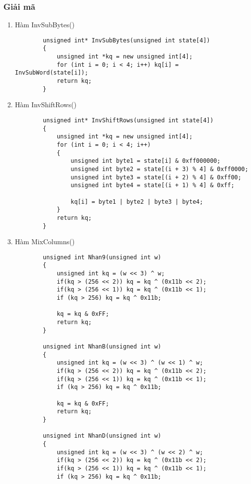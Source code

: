 \subsubsection{Giải mã}
\begin{enumerate}
	\item Hàm InvSubBytes()
	\begin{verbatim}
		unsigned int* InvSubBytes(unsigned int state[4])
		{
			unsigned int *kq = new unsigned int[4];
			for (int i = 0; i < 4; i++) kq[i] = InvSubWord(state[i]);
			return kq;
		}
	\end{verbatim}
	\item Hàm InvShiftRows()
	\begin{verbatim}
		unsigned int* InvShiftRows(unsigned int state[4])
		{
			unsigned int *kq = new unsigned int[4];
			for (int i = 0; i < 4; i++)
			{
				unsigned int byte1 = state[i] & 0xff000000;
				unsigned int byte2 = state[(i + 3) % 4] & 0xff0000;
				unsigned int byte3 = state[(i + 2) % 4] & 0xff00;
				unsigned int byte4 = state[(i + 1) % 4] & 0xff; 
				
				kq[i] = byte1 | byte2 | byte3 | byte4;
			}
			return kq;
		}
	\end{verbatim}
	\item Hàm MixColumns()
	\begin{verbatim}
		unsigned int Nhan9(unsigned int w)
		{
			unsigned int kq = (w << 3) ^ w;
			if(kq > (256 << 2)) kq = kq ^ (0x11b << 2);
			if(kq > (256 << 1)) kq = kq ^ (0x11b << 1);
			if (kq > 256) kq = kq ^ 0x11b;
			
			kq = kq & 0xFF;
			return kq;
		}
		
		unsigned int NhanB(unsigned int w)
		{
			unsigned int kq = (w << 3) ^ (w << 1) ^ w;
			if(kq > (256 << 2)) kq = kq ^ (0x11b << 2);
			if(kq > (256 << 1)) kq = kq ^ (0x11b << 1);
			if (kq > 256) kq = kq ^ 0x11b;
			
			kq = kq & 0xFF;
			return kq;
		}
		
		unsigned int NhanD(unsigned int w)
		{
			unsigned int kq = (w << 3) ^ (w << 2) ^ w;
			if(kq > (256 << 2)) kq = kq ^ (0x11b << 2);
			if(kq > (256 << 1)) kq = kq ^ (0x11b << 1);
			if (kq > 256) kq = kq ^ 0x11b;
			

\end{verbatim}
\end{enumerate}

